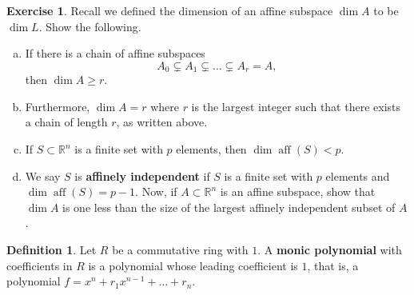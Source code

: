 \documentclass{amsart}
\theoremstyle{plain}
\theoremstyle{definition}
\newtheorem{definition}{Definition}
\newtheorem{exercise}[theorem]{Exercise}
\theoremstyle{definition}
\newcommand{\defining}[1]{\textbf{#1}}
\newcommand{\R}{\mathbb{R}}
\DeclareMathOperator{\aff}{aff}
\begin{document}
%


\begin{exercise}
Recall we defined the dimension of an affine subspace $\dim A$ to be $\dim L$.
Show the following.
\begin{enumerate}[a.]
\item If there is a chain of affine subspaces
\[ A_0 \subsetneq A_1 \subsetneq \dots \subsetneq A_r = A, \]
then $\dim A \geq r$.
\item Furthermore, $\dim A = r$ where $r$ is the largest integer
such that there exists a chain of length $r$, as written above.
\item If $S \subset \R^n$ is a finite set with $p$ elements, then $\dim \aff(S) < p$.
\item We say $S$ is \defining{affinely independent} if $S$ is a finite set
with $p$ elements and $\dim \aff(S) = p-1$.
Now, if $A \subset \R^n$ is an affine subspace, show that $\dim A$
is one less than the size of the largest affinely independent subset of $A$.
\end{enumerate}
\end{exercise}


\begin{definition}
Let $R$ be a commutative ring with $1$.
A \defining{monic polynomial} with coefficients in $R$ is a polynomial
whose leading coefficient is $1$, that is, a polynomial
$ f = x^n + r_1 x^{n-1} + \dots + r_n $.
\end{definition}
\end{document}
